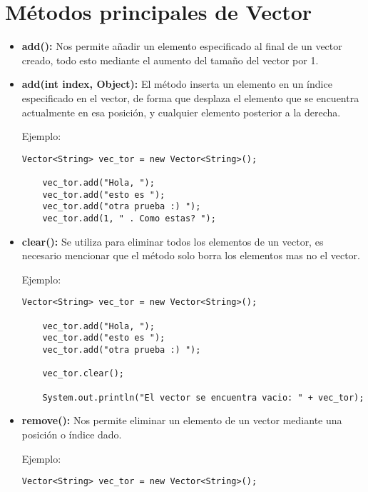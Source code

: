 \documentclass[12pt, letterpaper]{article} %
\begin{document}
\section*{Métodos principales de Vector}
\begin{itemize}
    \item \textbf{add():} Nos permite añadir un elemento especificado al final de un vector creado, todo esto mediante el aumento del tamaño del vector por 1.

    \item \textbf{add(int index, Object):} El método inserta un elemento en un índice especificado en el vector, de forma que desplaza el elemento que se encuentra actualmente en esa posición, y cualquier elemento posterior a la derecha.

    Ejemplo:
    \lstset{language = Java, breaklines=true, basicstyle=\footnotesize}
    \begin{lstlisting}[frame=single]
    Vector<String> vec_tor = new Vector<String>();

    vec_tor.add("Hola, ");
    vec_tor.add("esto es ");
    vec_tor.add("otra prueba :) ");
    vec_tor.add(1, " . Como estas? ");
    \end{lstlisting}

    \item \textbf{clear():} Se utiliza para eliminar todos los elementos de un vector, es necesario mencionar que el método solo borra los elementos mas no el vector.

    Ejemplo:
    \lstset{language = Java, breaklines=true, basicstyle=\footnotesize}
    \begin{lstlisting}[frame=single]
    Vector<String> vec_tor = new Vector<String>();

    vec_tor.add("Hola, ");
    vec_tor.add("esto es ");
    vec_tor.add("otra prueba :) ");

    vec_tor.clear();

    System.out.println("El vector se encuentra vacio: " + vec_tor);
    \end{lstlisting}

    \item \textbf{remove():} Nos permite eliminar un elemento de un vector mediante una posición o índice dado.

    Ejemplo:
    \lstset{language = Java, breaklines=true, basicstyle=\footnotesize}
    \begin{lstlisting}[frame=single]
    Vector<String> vec_tor = new Vector<String>();


\end{lstlisting}
\end{itemize}
\end{document}
